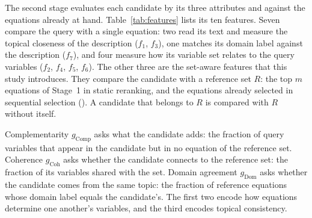 The second stage evaluates each candidate by its three attributes and against the equations already
at hand. Table~\ref{tab:features} lists its ten features. Seven compare the query with a single
equation: two read its text and measure the topical closeness of the description ($f_1$, $f_3$),
one matches its domain label against the description ($f_7$), and four measure how its variable set
relates to the query variables ($f_2$, $f_4$, $f_5$, $f_6$). The other three are the set-aware features that this
study introduces. They compare the candidate with a reference set $R$: the top $m$ equations of
Stage~1 in static reranking, and the equations already selected in sequential selection
(). A candidate that belongs to $R$ is compared with $R$ without itself.

Complementarity $g_{\mathrm{Comp}}$ asks what the candidate adds: the fraction of query variables
that appear in the candidate but in no equation of the reference set. Coherence $g_{\mathrm{Coh}}$
asks whether the candidate connects to the reference set: the fraction of its variables shared
with the set. Domain agreement $g_{\mathrm{Dom}}$ asks whether the candidate comes from the same
topic: the fraction of reference equations whose domain label equals the candidate's. The first
two encode how equations determine one another's variables, and the third encodes topical
consistency.


